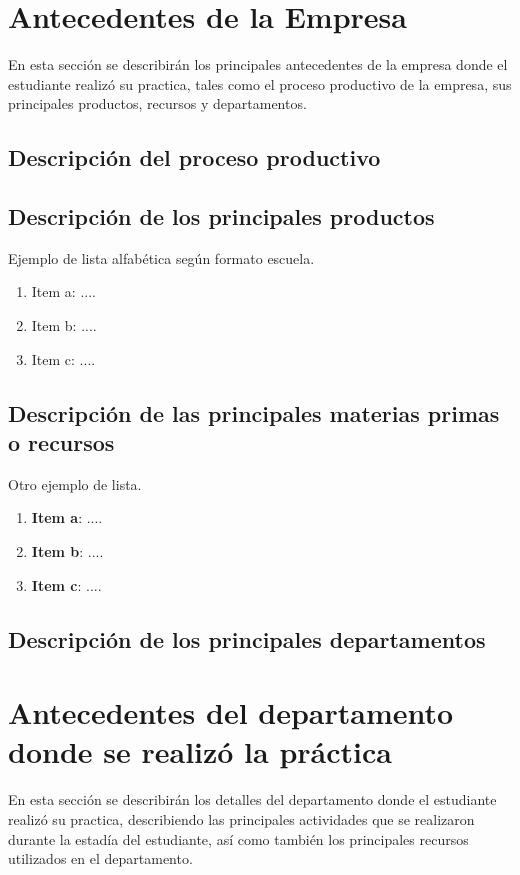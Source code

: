 \documentclass[12pt,letter,spanish]{article}
\begin{document}
\newpage
\section{Antecedentes de la Empresa} %
En esta sección se describirán los principales antecedentes de la empresa donde el estudiante realizó su practica, tales como el proceso productivo de la empresa, sus principales productos, recursos y departamentos.
\subsection{Descripción del proceso productivo}


\subsection{Descripción de los principales productos}

Ejemplo de lista alfabética según formato escuela.

 \begin{enumerate}[label=\alph*.]
 \item Item a: ....
 \item Item b: ....
 \item Item c: ....
 \end{enumerate}
 

\subsection{Descripción de las principales materias primas o recursos}

Otro ejemplo de lista.

\begin{enumerate}[label=\alph*.]
\item \textbf{Item a}: ....
\item \textbf{Item b}: ....
\item \textbf{Item c}: ....
\end{enumerate}
 

\subsection{Descripción de los principales departamentos}

\newpage

\section{Antecedentes del departamento donde se realizó la práctica} %
En esta sección se describirán los detalles del departamento donde el estudiante realizó su practica, describiendo las principales actividades que se realizaron durante la estadía del estudiante, así como también los principales recursos utilizados en el departamento.
\end{document}
